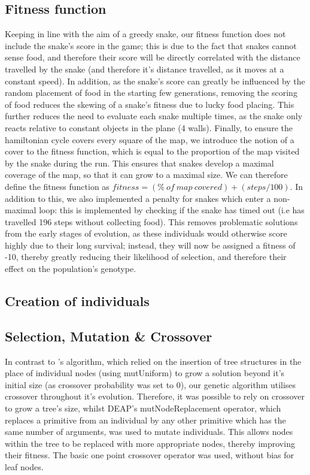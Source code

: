 \documentclass[british,10pt,a4paper]{article}
\begin{document}
\subsection{Fitness function}
\label{subsec:fitness_func}
Keeping in line with the aim of a greedy snake, our fitness function does not include the snake's score in the game; this is due to the fact that snakes cannot sense food, and therefore their score will be directly correlated with the distance travelled by the snake (and therefore it's distance travelled, as it moves at a constant speed). In addition, as the snake's score can greatly be influenced by the random placement of food in the starting few generations, removing the scoring of food reduces the skewing of a snake's fitness due to lucky food placing. This further reduces the need to evaluate each snake multiple times, as the snake only reacts relative to constant objects in the plane (4 walls). Finally, to ensure the hamiltonian cycle covers every square of the map, we introduce the notion of a cover to the fitness function, which is equal to the proportion of the map visited by the snake during the run. This ensures that snakes develop a maximal coverage of the map, so that it can grow to a maximal size. \newline
We can therefore define the fitness function as \(fitness= (\% \ of\ map\ covered) + (steps/100)\). \newline
In addition to this, we also implemented a penalty for snakes which enter a non-maximal loop: this is implemented by checking if the snake has timed out (i.e has travelled 196 steps without collecting food). This removes problematic solutions from the early stages of evolution, as these individuals would otherwise score highly due to their long survival; instead, they will now be assigned a fitness of -10, thereby greatly reducing their likelihood of selection, and therefore their effect on the population's genotype.

\subsection{Creation of individuals}
\subsection{Selection, Mutation \& Crossover}
In contrast to \citeauthor{Ehlis2000-sz}'s algorithm, which relied on the insertion of tree structures in the place of individual nodes (using mutUniform)  to grow a solution beyond it's initial size (as crossover probability was set to 0), our genetic algorithm utilises crossover throughout it's evolution. Therefore, it was possible to rely on crossover to grow a tree's size, whilst DEAP's mutNodeReplacement operator, which replaces a primitive from an individual by any other primitive which has the same number of arguments, was used to mutate individuals. This allows nodes within the tree to be replaced with more appropriate nodes, thereby improving their fitness. The basic one point crossover operator was used, without bias for leaf nodes. \newline
\end{document}

